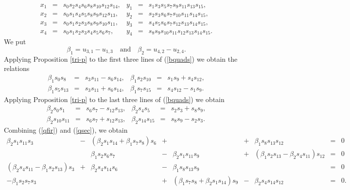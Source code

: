 \documentclass[letterpaper,10pt]{amsart}
\theoremstyle{definition}
\numberwithin{equation}{section}
\begin{document}
\begin{equation} \label{bquads} \begin{matrix} x_1 & = & s_0 s_2 s_4 s_6 s_8 s_{10} s_{12} s_{14}, & y_1 & = & s_1 s_3 s_5 s_7 s_9 s_{11} s_{13} s_{15}, \\
x_2 & = & s_0 s_1 s_4 s_5 s_8 s_9 s_{12} s_{13}, & y_2 & = & s_2 s_3 s_6 s_7 s_{10} s_{11} s_{14} s_{15}, \\
x_3 & = & s_0 s_1 s_2 s_3 s_8 s_9 s_{10} s_{11}, & y_3 & = & s_4 s_5 s_6 s_7 s_{12} s_{13} s_{14} s_{15}, \\
x_4 & = & s_0 s_1 s_2 s_3 s_4 s_5 s_6 s_7, & y_4 & = & s_8 s_9 s_{10} s_{11} s_{12} s_{13} s_{14} s_{15}. 
\end{matrix}
\end{equation} 
We put 
\begin{equation} \label{beta2} \beta_1 = u_{3,1} - u_{1,3} \quad \text{and} \quad \beta_2 = u_{4,2} - u_{2,4}.
\end{equation}
Applying Proposition \ref{tri-p} to the first three lines of (\ref{bquads}) we obtain the relations 
\begin{equation} \label{qfir} \begin{matrix} \beta_1 s_0 s_8 & = & s_3 s_{11} - s_6 s_{14}, & \beta_1 s_2 s_{10} & = & s_1 s_9 + s_4 s_{12}, \\
\beta_1 s_5 s_{13} & = & s_3 s_{11} + s_6 s_{14}, & \beta_1 s_7 s_{15} & = & s_4 s_{12} - s_1 s_9. \end{matrix}
\end{equation}
Applying Proposition \ref{tri-p} to the last three lines of (\ref{bquads}) we obtain
\begin{equation} \label{qsec} \begin{matrix} \beta_2 s_0 s_1 & = & s_6 s_7 - s_{12} s_{13}, & \beta_2 s_4 s_5 & = & s_2 s_3 + s_8 s_9, \\
\beta_2 s_{10} s_{11} & = & s_6 s_7 + s_{12} s_{13}, & \beta_2 s_{14} s_{15} & = & s_8 s_9 - s_2 s_3.
\end{matrix} 
\end{equation}
Combining (\ref{qfir}) and (\ref{qsec}), we obtain
\begin{equation} \label{bquadseq} \begin{matrix} \beta_2 s_1 s_{11} s_3 & - &  (\beta_2 s_1 s_{14} + \beta_1 s_7 s_8) s_6 & + & & + & \beta_1 s_8 s_{13} s_{12}  &   = & 0 \\
& & \beta_1 s_2 s_6 s_7 & - & \beta_2 s_1 s_{11} s_9 & + & (\beta_1 s_2 s_{13} -\beta_2  s_4 s_{11}) s_{12} & = & 0 \\
(\beta_2 s_4 s_{11} -\beta_1 s_2 s_{13})  s_3 & + & \beta_2 s_4 s_{14} s_6 & - & \beta_1 s_8 s_{13} s_9 & & & = & 0 \\
-\beta_1 s_2 s_7 s_3 & & & + & (\beta_1 s_7 s_8 + \beta_2 s_1 s_{14}) s_9 & - & \beta_2 s_4 s_{14} s_{12} & = & 0. 
\end{matrix} \end{equation} 
\end{document}
